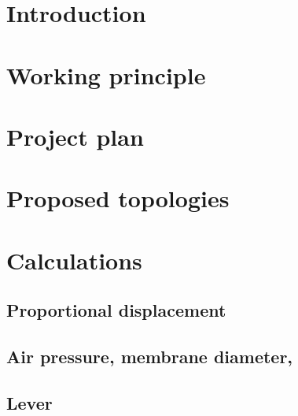 \section*{Introduction} 
\label{sec:intro}


\pagebreak      %
\section{Working principle}
\label{sec:principle}



\pagebreak      %
\section{Project plan}
\label{sec:plan}


\pagebreak      %
\section{Proposed topologies}
\label{sec:topologies}



\pagebreak      %
\section{Calculations}
\label{sec:calculations}

\subsection{Proportional displacement}
\label{sub:displacement}


\subsection{Air pressure, membrane diameter, }
\label{sub:pressure-diameter}

\subsection{Lever}
\label{sub:lever}

